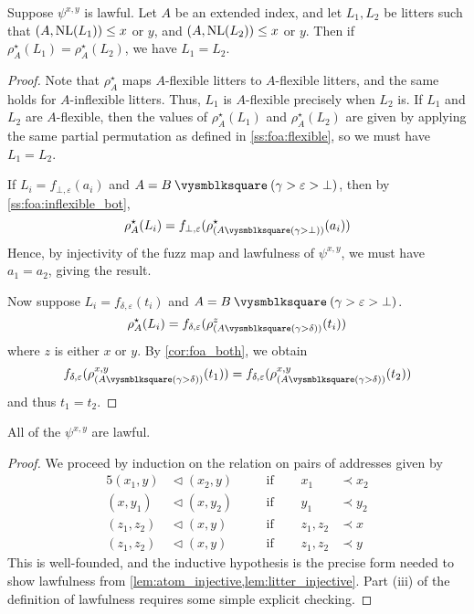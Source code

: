 \begin{lemma}
    \label{lem:litter_injective}
    Suppose \( \psi^{x,y} \) is lawful.
    Let \( A \) be an extended index, and let \( L_1, L_2 \) be litters such that \( (A, \operatorname{NL}(L_1)) \leq x \) or \( y \), and \( (A, \operatorname{NL}(L_2)) \leq x \) or \( y \).
    Then if \( \rho^\star_A(L_1) = \rho^\star_A(L_2) \), we have \( L_1 = L_2 \).
\end{lemma}
\begin{proof}
    Note that \( \rho^\star_A \) maps \( A \)-flexible litters to \( A \)-flexible litters, and the same holds for \( A \)-inflexible litters.
    Thus, \( L_1 \) is \( A \)-flexible precisely when \( L_2 \) is.
    If \( L_1 \) and \( L_2 \) are \( A \)-flexible, then the values of \( \rho^\star_A(L_1) \) and \( \rho^\star_A(L_2) \) are given by applying the same partial permutation as defined in \cref{ss:foa:flexible}, so we must have \( L_1 = L_2 \).

    If \( L_i = f_{\bot,\varepsilon}(a_i) \) and \( A = B \pcomp (\gamma > \varepsilon > \bot) \), then by \cref{ss:foa:inflexible_bot},
    \[ \rho^\star_A(L_i) = f_{\bot,\varepsilon}(\rho^\star_{(A \pcomp (\gamma > \bot))}(a_i)) \]
    Hence, by injectivity of the fuzz map and lawfulness of \( \psi^{x,y} \), we must have \( a_1 = a_2 \), giving the result.

    Now suppose \( L_i = f_{\delta,\varepsilon}(t_i) \) and \( A = B \pcomp (\gamma > \varepsilon > \bot) \).
    \[ \rho^\star_A(L_i) = f_{\delta,\varepsilon}(\rho^z_{(A \pcomp (\gamma > \delta))}(t_i)) \]
    where \( z \) is either \( x \) or \( y \).
    By \cref{cor:foa_both}, we obtain
    \[ f_{\delta,\varepsilon}(\rho^{x,y}_{(A \pcomp (\gamma > \delta))}(t_1)) = f_{\delta,\varepsilon}(\rho^{x,y}_{(A \pcomp (\gamma > \delta))}(t_2)) \]
    and thus \( t_1 = t_2 \).
\end{proof}

\begin{lemma}
    All of the \( \psi^{x,y} \) are lawful.
\end{lemma}
\begin{proof}
    We proceed by induction on the relation on pairs of addresses given by
    \begin{alignat*}{5}
        (x_1, y) &\vartriangleleft (x_2, y) && \quad\text{if }\quad & x_1 &\prec x_2 \\
        (x, y_1) &\vartriangleleft (x, y_2) && \quad\text{if }\quad & y_1 &\prec y_2 \\
        (z_1, z_2) &\vartriangleleft (x, y) && \quad\text{if }\quad & z_1, z_2 &\prec x \\
        (z_1, z_2) &\vartriangleleft (x, y) && \quad\text{if }\quad & z_1, z_2 &\prec y
    \end{alignat*}
    This is well-founded, and the inductive hypothesis is the precise form needed to show lawfulness from \cref{lem:atom_injective,lem:litter_injective}.
    Part (iii) of the definition of lawfulness requires some simple explicit checking.
\end{proof}

